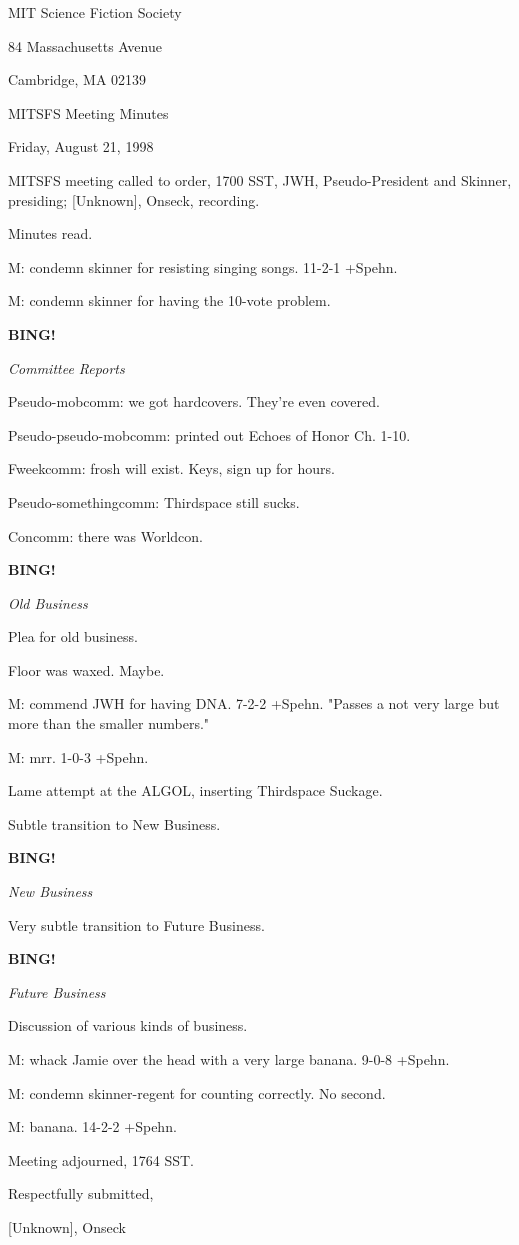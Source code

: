 \documentclass[12pt]{article}
\newcommand{\bing}{{\bf BING!} }
\newcommand{\goto}[1]{\bing \vskip 12pt \centerline{{\em{#1}}}}
\begin{document}
\begin{center}

MIT Science Fiction Society 

84 Massachusetts Avenue

Cambridge, MA 02139

\vspace{12pt}

MITSFS Meeting Minutes 

Friday, August 21, 1998

\end{center}
 
\vspace{18pt}

\setlength{\parskip}{6pt}

\noindent
MITSFS meeting called to order, 1700 SST,
JWH, Pseudo-President and Skinner, presiding; [Unknown], Onseck, recording.

Minutes read.

M: condemn skinner for resisting singing songs. 11-2-1 +Spehn.

M: condemn skinner for having the 10-vote problem.

\goto{Committee Reports}

Pseudo-mobcomm: we got hardcovers. They're even covered.

Pseudo-pseudo-mobcomm: printed out Echoes of Honor Ch. 1-10.

Fweekcomm: frosh will exist. Keys, sign up for hours.

Pseudo-somethingcomm: Thirdspace still sucks.

Concomm: there was Worldcon.

\goto{Old Business}

Plea for old business.

Floor was waxed. Maybe.

M: commend JWH for having DNA. 7-2-2 +Spehn. "Passes a not very large but more than the smaller numbers."

M: mrr. 1-0-3 +Spehn.

Lame attempt at the ALGOL, inserting Thirdspace Suckage.

Subtle transition to New Business.

\goto{New Business}

Very subtle transition to Future Business.

\goto{Future Business}

Discussion of various kinds of business.

M: whack Jamie over the head with a very large banana. 9-0-8 +Spehn.

M: condemn skinner-regent for counting correctly. No second.

M: banana. 14-2-2 +Spehn.

\vspace{12pt}

\noindent
Meeting adjourned, 1764 SST.

\vspace{18pt}

\centerline{Respectfully submitted,}
\centerline{[Unknown], Onseck}
\end{document}
